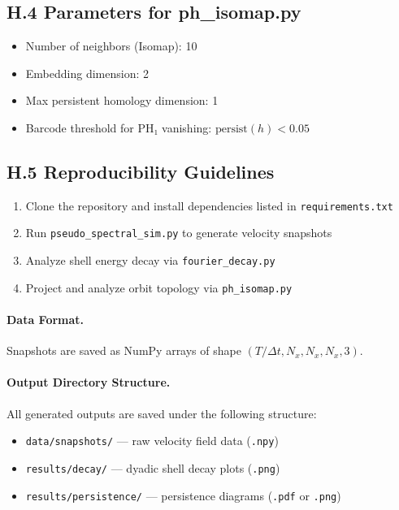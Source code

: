 \documentclass[11pt]{article}
\theoremstyle{definition}
\begin{document}
\subsection*{H.4 Parameters for ph\_isomap.py}

\begin{itemize}
  \item Number of neighbors (Isomap): 10
  \item Embedding dimension: 2
  \item Max persistent homology dimension: 1
  \item Barcode threshold for PH₁ vanishing: \( \mathrm{persist}(h) < 0.05 \)
\end{itemize}

\subsection*{H.5 Reproducibility Guidelines}

\begin{enumerate}
  \item Clone the repository and install dependencies listed in \texttt{requirements.txt}
  \item Run \texttt{pseudo\_spectral\_sim.py} to generate velocity snapshots
  \item Analyze shell energy decay via \texttt{fourier\_decay.py}
  \item Project and analyze orbit topology via \texttt{ph\_isomap.py}
\end{enumerate}

\paragraph{Data Format.} Snapshots are saved as NumPy arrays of shape \( (T/\Delta t, N_x, N_x, N_x, 3) \).

\paragraph{Output Directory Structure.}
All generated outputs are saved under the following structure:
\begin{itemize}
  \item \texttt{data/snapshots/} — raw velocity field data (\texttt{.npy})
  \item \texttt{results/decay/} — dyadic shell decay plots (\texttt{.png})
  \item \texttt{results/persistence/} — persistence diagrams (\texttt{.pdf} or \texttt{.png})
\end{itemize}
\end{document}
